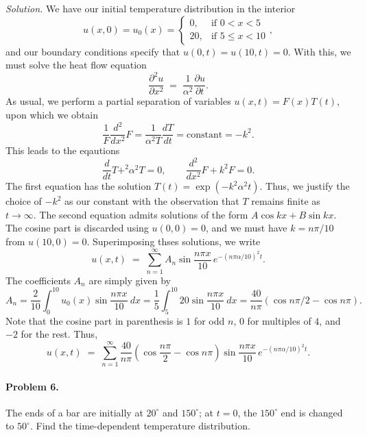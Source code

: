 \documentclass[10pt]{article}
\newcommand\ppt[1]{\frac{\partial #1}{\partial t}}
\newcommand\pp[3][]{\frac{\partial^{#1}{#2}}{\partial {#3}^{#1}}}
\newcommand\ddt[1]{\frac{d #1}{d t}}
\newcommand\dd[3][]{\frac{d^{#1}{#2}}{d {#3}^{#1}}}
\begin{document}
        \textit{Solution.} We have our initial temperature distribution in the interior
        \[
                u(x, 0) = u_0(x) = \begin{cases} 0, &\text{if } 0 < x < 5 \\ 20, &\text{if }5 \leq x < 10 \end{cases},
        \]
        and our boundary conditions specify that $u(0, t) = u(10, t) = 0$. With this, we must solve the heat flow equation
        \[
                \pp[2]{u}{x} \;=\; \frac{1}{\alpha^2}\ppt{u}.
        \]
        As usual, we perform a partial separation of variables $u(x, t) = F(x)T(t)$, upon which we obtain
        \[
                \frac{1}{F} \dd[2]{}{x}F = \frac{1}{\alpha^2 T} \ddt{T} = \text{constant} = -k^2.
        \]
        This leads to the eqautions
        \[
        \ddt{}T + ^2\alpha^2 T = 0, \quad\quad \dd[2]{}{x}F + k^2 F = 0.
        \]
        The first equation has the solution $T(t) = \exp(-k^2\alpha^2 t)$.
        Thus, we justify the choice of $-k^2$ as our constant with the observation that $T$ remains finite as $t \to \infty$.
        The second equation admits solutions of the form $A\cos{kx} + B\sin{kx}$. The cosine part is discarded using $u(0, 0) = 0$, and
        we must have $k = n\pi /10$ from $u(10, 0) = 0$. Superimposing thses solutions, we write
        \[
                u(x, t) \;=\; \sum_{n = 1}^\infty A_n \sin\frac{n\pi x}{10} \,e^{-(n\pi\alpha /10)^2 t}.
        \]
        The coefficients $A_n$ are simply given by
        \[
                A_n = \frac{2}{10}\int_0^{10} u_0(x)\sin\frac{n\pi x}{10} \:dx = \frac{1}{5}\int_5^{10} 20\sin\frac{n\pi x}{10} \:dx
                        = \frac{40}{n\pi} (\cos{n\pi /2} - \cos{n\pi}).
        \]
        Note that the cosine part in parenthesis is $1$ for odd $n$, $0$ for multiples of $4$, and $-2$ for the rest. Thus,
        \[
                u(x, t) \;=\; \sum_{n = 1}^\infty \frac{40}{n\pi} \left(\cos\frac{n\pi}{2} - \cos{n\pi}\right) \sin\frac{n\pi x}{10} \,e^{-(n\pi\alpha /10)^2 t}.
        \]

        \paragraph{Problem 6.} The ends of a bar are initially at $20^\circ$ and $150^\circ$; at $t = 0$, the $150^\circ$ end is changed to $50^\circ$.
        Find the time-dependent temperature distribution. \\
\end{document}
